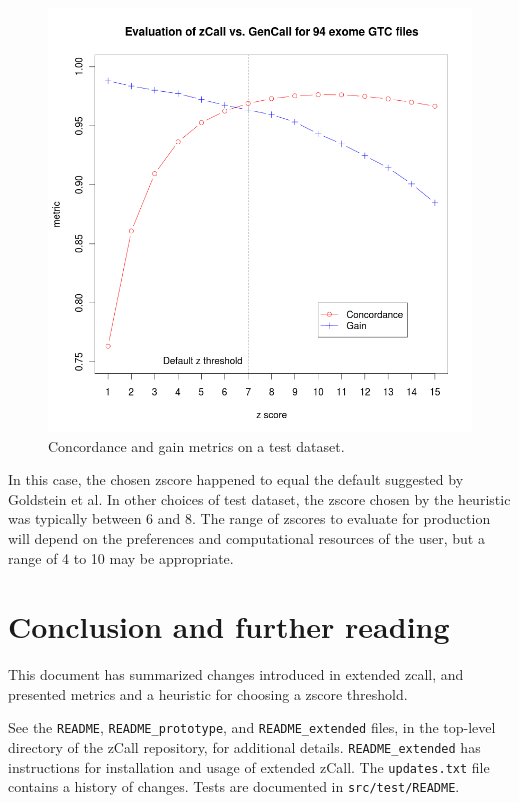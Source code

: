 \documentclass{article}
\begin{document}
\begin{figure}[t]
\includegraphics[width=1.0\textwidth]{concordance_gain_means.png}
\caption{Concordance and gain metrics on a test dataset.}
\label{fig:zscores}
\end{figure}

In this case, the chosen zscore happened to equal the default suggested by Goldstein et al. In other choices of test dataset, the zscore chosen by the heuristic was typically between 6 and 8. The range of zscores to evaluate for production will depend on the preferences and computational resources of the user, but a range of 4 to 10 may be appropriate.

\section{Conclusion and further reading}

This document has summarized changes introduced in extended zcall, and presented metrics and a heuristic for choosing a zscore threshold.

See the \texttt{README}, \texttt{README\_prototype}, and \texttt{README\_extended} files, in the top-level directory of the zCall repository, for additional details.  \texttt{README\_extended} has instructions for installation and usage of extended zCall. The  \texttt{updates.txt} file contains a history of changes. Tests are documented in \texttt{src/test/README}.
\end{document}
